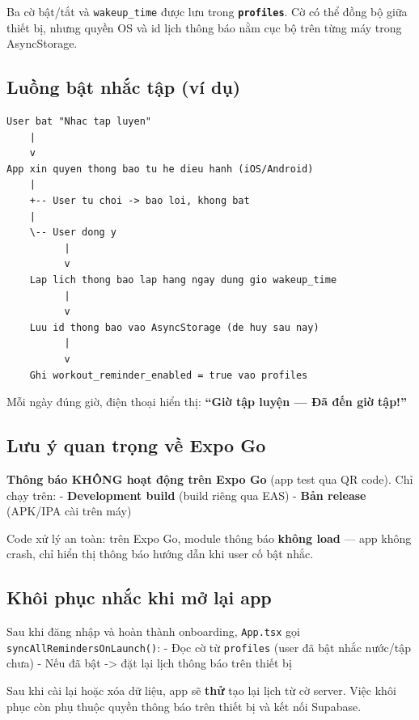 \documentclass[12pt,a4paper]{article}
\begin{document}
Ba cờ bật/tắt và \texttt{wakeup\_time} được lưu trong
\textbf{\texttt{profiles}}. Cờ có thể đồng bộ giữa thiết bị, nhưng quyền
OS và id lịch thông báo nằm cục bộ trên từng máy trong AsyncStorage.

\subsection{Luồng bật nhắc tập (ví
dụ)}\label{luux1ed3ng-bux1eadt-nhux1eafc-tux1eadp-vuxed-dux1ee5}

\begin{verbatim}
User bat "Nhac tap luyen"
    |
    v
App xin quyen thong bao tu he dieu hanh (iOS/Android)
    |
    +-- User tu choi -> bao loi, khong bat
    |
    \-- User dong y
          |
          v
    Lap lich thong bao lap hang ngay dung gio wakeup_time
          |
          v
    Luu id thong bao vao AsyncStorage (de huy sau nay)
          |
          v
    Ghi workout_reminder_enabled = true vao profiles
\end{verbatim}

Mỗi ngày đúng giờ, điện thoại hiển thị: \textbf{``Giờ tập luyện --- Đã
đến giờ tập!''}

\subsection{Lưu ý quan trọng về Expo
Go}\label{lux1b0u-uxfd-quan-trux1ecdng-vux1ec1-expo-go}

\textbf{Thông báo KHÔNG hoạt động trên Expo Go} (app test qua QR code).
Chỉ chạy trên: - \textbf{Development build} (build riêng qua EAS) -
\textbf{Bản release} (APK/IPA cài trên máy)

Code xử lý an toàn: trên Expo Go, module thông báo \textbf{không load}
--- app không crash, chỉ hiển thị thông báo hướng dẫn khi user cố bật
nhắc.

\subsection{Khôi phục nhắc khi mở lại
app}\label{khuxf4i-phux1ee5c-nhux1eafc-khi-mux1edf-lux1ea1i-app}

Sau khi đăng nhập và hoàn thành onboarding, \texttt{App.tsx} gọi
\texttt{syncAllRemindersOnLaunch()}: - Đọc cờ từ \texttt{profiles} (user
đã bật nhắc nước/tập chưa) - Nếu đã bật -\textgreater{} đặt lại lịch
thông báo trên thiết bị

Sau khi cài lại hoặc xóa dữ liệu, app sẽ \textbf{thử} tạo lại lịch từ cờ
server. Việc khôi phục còn phụ thuộc quyền thông báo trên thiết bị và
kết nối Supabase.
\end{document}
